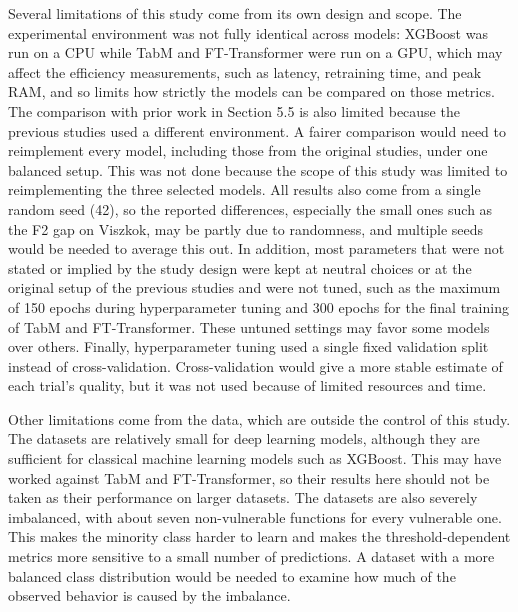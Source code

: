 Several limitations of this study come from its own design and scope. The experimental environment was not fully identical across models: XGBoost was run on a CPU while TabM and FT-Transformer were run on a GPU, which may affect the efficiency measurements, such as latency, retraining time, and peak RAM, and so limits how strictly the models can be compared on those metrics. The comparison with prior work in Section 5.5 is also limited because the previous studies used a different environment. A fairer comparison would need to reimplement every model, including those from the original studies, under one balanced setup. This was not done because the scope of this study was limited to reimplementing the three selected models. All results also come from a single random seed (42), so the reported differences, especially the small ones such as the F2 gap on Viszkok, may be partly due to randomness, and multiple seeds would be needed to average this out. In addition, most parameters that were not stated or implied by the study design were kept at neutral choices or at the original setup of the previous studies and were not tuned, such as the maximum of 150 epochs during hyperparameter tuning and 300 epochs for the final training of TabM and FT-Transformer. These untuned settings may favor some models over others. Finally, hyperparameter tuning used a single fixed validation split instead of cross-validation. Cross-validation would give a more stable estimate of each trial’s quality, but it was not used because of limited resources and time.

Other limitations come from the data, which are outside the control of this study. The datasets are relatively small for deep learning models, although they are sufficient for classical machine learning models such as XGBoost. This may have worked against TabM and FT-Transformer, so their results here should not be taken as their performance on larger datasets. The datasets are also severely imbalanced, with about seven non-vulnerable functions for every vulnerable one. This makes the minority class harder to learn and makes the threshold-dependent metrics more sensitive to a small number of predictions. A dataset with a more balanced class distribution would be needed to examine how much of the observed behavior is caused by the imbalance.
